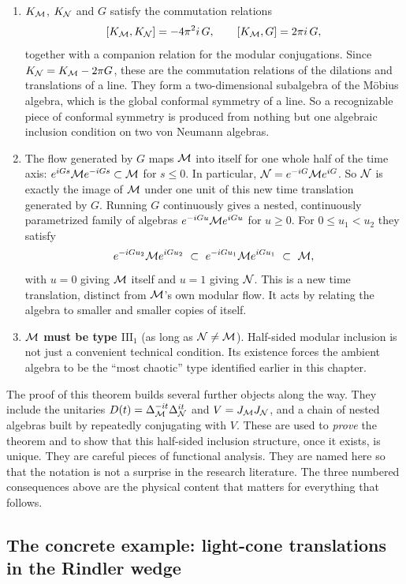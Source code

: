 \begin{enumerate}
\item $K_{\mathcal{M}}$, $K_{\mathcal{N}}$ and $G$ satisfy the commutation relations
\[
[K_{\mathcal{M}},K_{\mathcal{N}}] = -4\pi^2i\,G , \qquad [K_{\mathcal{M}},G] = 2\pi i\,G ,
\]
together with a companion relation for the modular conjugations. Since $K_{\mathcal{N}}=K_{\mathcal{M}}-2\pi G$, these are the
commutation relations of the dilations and translations of a line. They form a two-dimensional subalgebra of
the M\"obius algebra, which is the global conformal symmetry of a line. So a recognizable piece of conformal
symmetry is produced from nothing but one algebraic inclusion condition on two von Neumann algebras.
\item The flow generated by $G$ maps $\mathcal{M}$ into itself for one whole half of the time axis:
$e^{iGs}\mathcal{M} e^{-iGs}\subset\mathcal{M}$ for $s\le0$. In particular, $\mathcal{N}=e^{-iG}\mathcal{M} e^{iG}$. So $\mathcal{N}$ is exactly the image
of $\mathcal{M}$ under one unit of this new time translation generated by $G$. Running $G$ continuously gives a nested,
continuously parametrized family of algebras $e^{-iGu}\mathcal{M} e^{iGu}$ for $u\ge0$. For $0\le u_1<u_2$ they satisfy
\[
e^{-iGu_2}\M e^{iGu_2}\ \subset\ e^{-iGu_1}\M e^{iGu_1}\ \subset\ \M ,
\]
with $u=0$ giving $\mathcal{M}$ itself and $u=1$ giving $\mathcal{N}$. This is a new time translation, distinct from $\mathcal{M}$'s own
modular flow. It acts by relating the algebra to smaller and smaller copies of itself.
\item \textbf{$\mathcal{M}$ must be type $\mathrm{III}_1$} (as long as $\mathcal{N}\ne\mathcal{M}$). Half-sided modular inclusion is not
just a convenient technical condition. Its existence forces the ambient algebra to be the ``most chaotic'' type
identified earlier in this chapter.
\end{enumerate}
The proof of this theorem builds several further objects along the way. They include the unitaries
$D(t)=\Delta_{\mathcal{M}}^{-it}\Delta_{\mathcal{N}}^{it}$ and $V=J_{\mathcal{M}} J_{\mathcal{N}}$, and a chain of nested algebras built by repeatedly
conjugating with $V$. These are used to \emph{prove} the theorem and to show that this half-sided inclusion
structure, once it exists, is unique. They are careful pieces of functional analysis. They are named here so
that the notation is not a surprise in the research literature. The three numbered consequences above are the
physical content that matters for everything that follows.

\subsection*{The concrete example: light-cone translations in the Rindler wedge}

